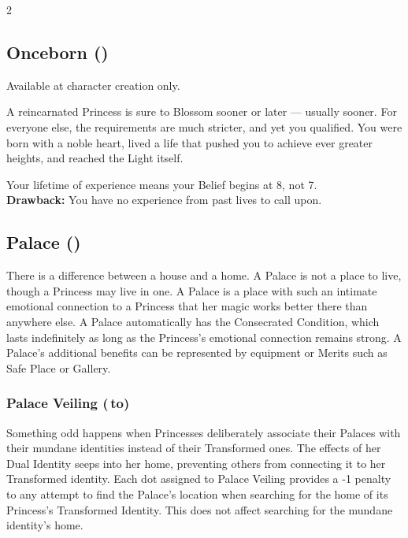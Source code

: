 \begin{multicols}{2}
\subsection*{Onceborn (\textbullet\textbullet)}

Available at character creation only.

A reincarnated Princess is sure to Blossom sooner or later — usually sooner. For everyone else, the requirements are much stricter, and yet you qualified. You were born with a noble heart, lived a life that pushed you to achieve ever greater heights, and reached the Light itself. 

Your lifetime of experience means your Belief begins at 8, not 7.\\

\noindent\textbf{Drawback:} You have no experience from past lives to call upon. 

\subsection*{Palace (\textbullet)}

There is a difference between a house and a home. A Palace is not a place to live, though a Princess may live in one. A Palace is a place with such an intimate emotional connection to a Princess that her magic works better there than anywhere else. A Palace automatically has the Consecrated Condition, which lasts indefinitely as long as the Princess's emotional connection remains strong. A Palace's additional benefits can be represented by equipment or Merits such as Safe Place or Gallery.

\subsubsection*{Palace Veiling (\textbullet\,\nobreak\hspace{.16667em}to\nobreak\hspace{.16667em}\textbullet\textbullet\textbullet)}

Something odd happens when Princesses deliberately associate their Palaces with their mundane identities instead of their Transformed ones. The effects of her Dual Identity seeps into her home, preventing others from connecting it to her Transformed identity. Each dot assigned to Palace Veiling provides a -1 penalty to any attempt to find the Palace's location when searching for the home of its Princess's Transformed Identity. This does not affect searching for the mundane identity's home. 


\end{multicols}
